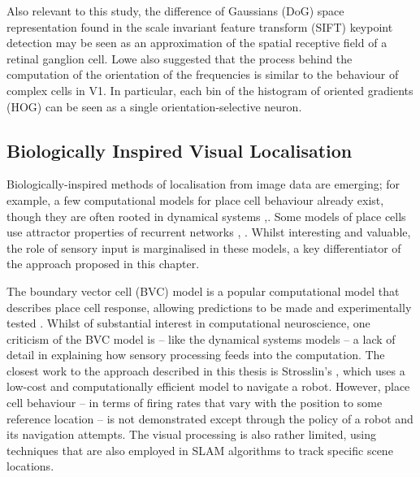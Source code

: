 Also relevant to this study, the difference of Gaussians (DoG) space representation found in the scale invariant feature transform (SIFT) keypoint detection \cite{lowe2004distinctive} may be seen as an approximation of the spatial receptive field of a retinal ganglion cell. Lowe also suggested that the process behind the computation of the orientation of the frequencies is similar to the behaviour of complex cells in V1. In particular, each bin of the histogram of oriented gradients (HOG) can be seen as a single orientation-selective neuron.



\subsection{Biologically Inspired Visual Localisation}

Biologically-inspired methods of localisation from image data are emerging; for example, a few computational models for place cell behaviour already exist, though they are often rooted in dynamical systems \cite{blair2008conversion},\cite{bechtel2013investigating}. Some models of place cells use attractor properties of recurrent networks \cite{stringer2002self}, \cite{moser2008place}.  Whilst interesting and valuable, the role of sensory input is marginalised in these models, a key differentiator of the approach proposed in this chapter.

The boundary vector cell (BVC) model \cite{barry2006boundary} is a popular computational model that describes place cell response, allowing predictions to be made and experimentally tested \cite{burgess2000predictions}. Whilst of substantial interest in computational neuroscience, one criticism of the BVC model is -- like the dynamical systems models -- a lack of detail in explaining how sensory processing feeds into the computation. The closest work to the approach described in this thesis is Strosslin's \cite{strosslin2005robust}, which uses a low-cost and computationally efficient model to navigate a robot.  However, place cell behaviour -- in terms of firing rates that vary with the position to some reference location -- is not demonstrated except through the policy of a robot and its navigation attempts.  The visual processing is also rather limited, using techniques that are also employed in SLAM algorithms \cite{alcantarilla2010visual} to track specific scene locations. 


